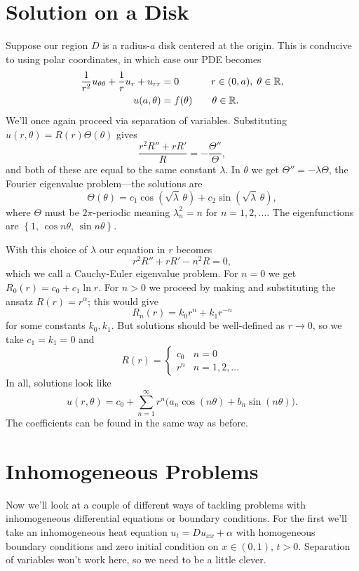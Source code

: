 \documentclass[../m180main.tex]{subfiles}
\begin{document}
\section{Solution on a Disk}
Suppose our region $D$ is a radius-$a$ disk centered at the origin.
This is conducive to using polar coordinates, in which case our PDE becomes
\begin{align*}
    \frac{1}{r^2} u_{\theta\theta} + \frac{1}{r}u_r + u_{rr} &= 0 \qquad\quad\; r \in (0,a), \; \theta \in \mathbb{R}, \\
    u(a,\theta) &= f(\theta) \qquad \theta \in \mathbb{R}.
\end{align*}
We'll once again proceed via separation of variables.
Substituting $u(r,\theta) = R(r) \Theta(\theta)$ gives
\[ \frac{r^2 R'' + rR'}{R} = -\frac{\Theta''}{\Theta}, \]
and both of these are equal to the same constant $\lambda$.
In $\theta$ we get $\Theta'' = -\lambda \Theta$, the Fourier eigenvalue problem---the solutions are
\[ \Theta(\theta) = c_1 \cos\left( \sqrt{\lambda} \,\theta \right) + c_2 \sin \left( \sqrt{\lambda} \,\theta \right), \]
where $\Theta$ must be $2\pi$-periodic meaning $\lambda_n^2 = n$ for $n = 1, 2, \ldots$.
The eigenfunctions are $\left\{ 1, \, \cos n\theta, \, \sin n\theta \right\}$.

With this choice of $\lambda$ our equation in $r$ becomes
\[ r^2 R'' + rR' - n^2 R = 0, \]
which we call a Cauchy-Euler eigenvalue problem.
For $n=0$ we get $R_0(r) = c_0 + c_1 \ln r$.
For $n > 0$ we proceed by making and substituting the ansatz $R(r) = r^{\alpha}$; this would give
\[ R_n(r) = k_0 r^{n} + k_1 r^{-n} \]
for some constants $k_0, k_1$.
But solutions should be well-defined as $r \to 0$, so we take $c_1 = k_1 = 0$ and
\[ R(r) = \begin{cases} c_0 & n = 0 \\  r^{n} & n = 1, 2, \ldots \end{cases} \]
In all, solutions look like
\[ u(r,\theta) = c_0 + \sum_{n=1}^{\infty} r^{n} \big( a_n \cos (n\theta) + b_n \sin (n\theta) \big). \]
The coefficients can be found in the same way as before.

\section{Inhomogeneous Problems}
Now we'll look at a couple of different ways of tackling problems with inhomogeneous differential equations or boundary conditions.
For the first we'll take an inhomogeneous heat equation $u_t = D u_{xx} + \alpha$ with homogeneous boundary conditions and zero initial condition on $x \in (0,1)$, $t > 0$.
Separation of variables won't work here, so we need to be a little clever.
\end{document}
